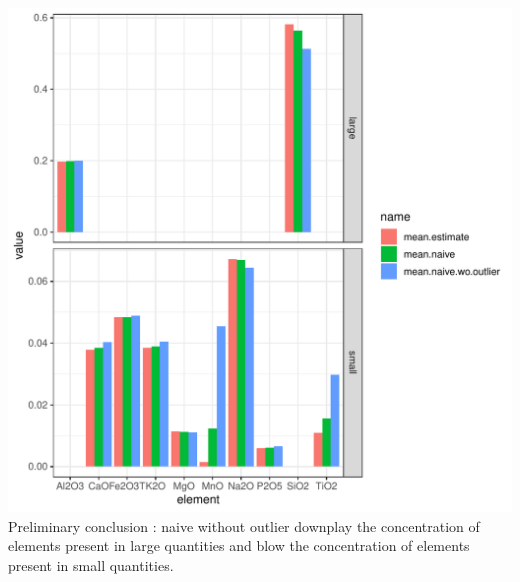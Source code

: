 \documentclass[a4paper,oneside,12pt,titlepage]{article}\usepackage[]{graphicx}\usepackage[]{color}
\makeatletter
\def\maxwidth{ %
  \ifdim\Gin@nat@width>\linewidth
    \linewidth
  \else
    \Gin@nat@width
  \fi
}
\newenvironment{kframe}{%
 \def\at@end@of@kframe{}%
 \ifinner\ifhmode%
  \def\at@end@of@kframe{\end{minipage}}%
  \begin{minipage}{\columnwidth}%
 \fi\fi%
 \def\FrameCommand##1{\hskip\@totalleftmargin \hskip-\fboxsep
 \colorbox{shadecolor}{##1}\hskip-\fboxsep
     \hskip-\linewidth \hskip-\@totalleftmargin \hskip\columnwidth}%
 \MakeFramed {\advance\hsize-\width
   \@totalleftmargin\z@ \linewidth\hsize
   \@setminipage}}%
 {\par\unskip\endMakeFramed%
 \at@end@of@kframe}
\newenvironment{knitrout}{}{} %
\makeatother
\begin{document}
\begin{knitrout}
\begin{kframe}
\begin{alltt}
\end{alltt}
\end{kframe}
\includegraphics[width=\maxwidth]{figure/unnamed-chunk-14-1} 
\end{knitrout}
Preliminary conclusion : naive without outlier downplay the concentration of elements present in large quantities and blow the concentration of elements present in small quantities.
\end{document}
